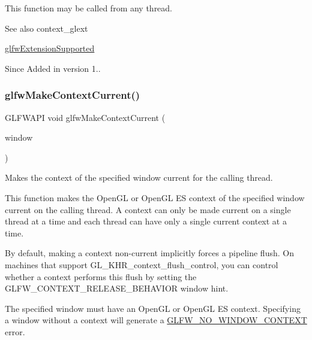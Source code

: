 This function may be called from any thread.

\begin{DoxySeeAlso}{See also}
context\+\_\+glext 

\hyperlink{group__context_ga9a28c712d35f9e43534e1d03b051c04c}{glfw\+Extension\+Supported}
\end{DoxySeeAlso}
\begin{DoxySince}{Since}
Added in version 1.. 
\end{DoxySince}
\mbox{\label{group__context_gafd76c93e15ec8b0b90506a9936a46185}} 
\subsubsection{\texorpdfstring{glfw\+Make\+Context\+Current()}{glfwMakeContextCurrent()}}
{\footnotesize\ttfamily G\+L\+F\+W\+A\+PI void glfw\+Make\+Context\+Current (\begin{DoxyParamCaption}\item[{\hyperlink{group__window_ga3c96d80d363e67d13a41b5d1821f3242}{G\+L\+F\+Wwindow} $\ast$}]{window }\end{DoxyParamCaption})}



Makes the context of the specified window current for the calling thread. 

This function makes the Open\+GL or Open\+GL ES context of the specified window current on the calling thread. A context can only be made current on a single thread at a time and each thread can have only a single current context at a time.

By default, making a context non-\/current implicitly forces a pipeline flush. On machines that support {\ttfamily G\+L\+\_\+\+K\+H\+R\+\_\+context\+\_\+flush\+\_\+control}, you can control whether a context performs this flush by setting the G\+L\+F\+W\+\_\+\+C\+O\+N\+T\+E\+X\+T\+\_\+\+R\+E\+L\+E\+A\+S\+E\+\_\+\+B\+E\+H\+A\+V\+I\+OR window hint.

The specified window must have an Open\+GL or Open\+GL ES context. Specifying a window without a context will generate a \hyperlink{group__errors_gacff24d2757da752ae4c80bf452356487}{G\+L\+F\+W\+\_\+\+N\+O\+\_\+\+W\+I\+N\+D\+O\+W\+\_\+\+C\+O\+N\+T\+E\+XT} error.


